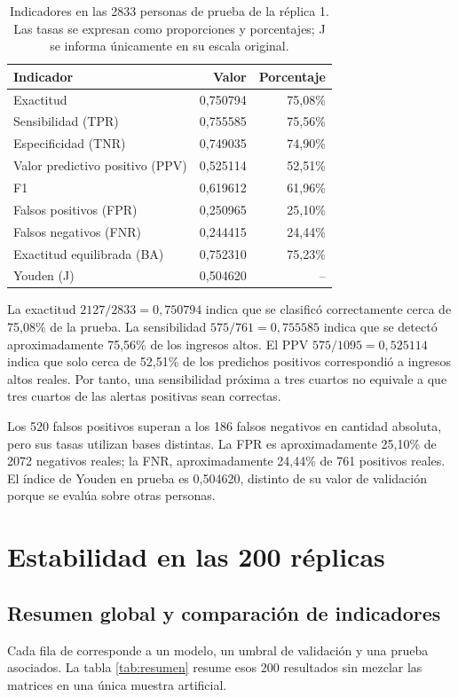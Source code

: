 \documentclass[11pt,a4paper]{article}
\newcommand{\archivo}[1]{\path{#1}}
\begin{document}
\begin{table}[H]
\centering
\caption[Indicadores en las 2833 personas de prueba de la réplica 1.]{Indicadores en las 2833 personas de prueba de la réplica 1. Las tasas se expresan como proporciones y porcentajes; J se informa únicamente en su escala original.}\label{tab:metricas1}
\small
\setlength{\tabcolsep}{4pt}
\begin{tabular}{lrr}
\toprule
Indicador & Valor & Porcentaje \\
\midrule
Exactitud & 0,750794 & 75,08\% \\
Sensibilidad (TPR) & 0,755585 & 75,56\% \\
Especificidad (TNR) & 0,749035 & 74,90\% \\
Valor predictivo positivo (PPV) & 0,525114 & 52,51\% \\
F1 & 0,619612 & 61,96\% \\
Falsos positivos (FPR) & 0,250965 & 25,10\% \\
Falsos negativos (FNR) & 0,244415 & 24,44\% \\
Exactitud equilibrada (BA) & 0,752310 & 75,23\% \\
Youden (J) & 0,504620 & -- \\
\bottomrule
\end{tabular}
\end{table}

La exactitud $2127/2833=0,750794$ indica que se clasificó correctamente cerca de 75,08\% de la prueba. La sensibilidad $575/761=0,755585$ indica que se detectó aproximadamente 75,56\% de los ingresos altos. El PPV $575/1095=0,525114$ indica que solo cerca de 52,51\% de los predichos positivos correspondió a ingresos altos reales. Por tanto, una sensibilidad próxima a tres cuartos no equivale a que tres cuartos de las alertas positivas sean correctas.

Los 520 falsos positivos superan a los 186 falsos negativos en cantidad absoluta, pero sus tasas utilizan bases distintas. La FPR es aproximadamente 25,10\% de 2072 negativos reales; la FNR, aproximadamente 24,44\% de 761 positivos reales. El índice de Youden en prueba es 0,504620, distinto de su valor de validación porque se evalúa sobre otras personas.

\section{Estabilidad en las 200 réplicas}
\subsection{Resumen global y comparación de indicadores}
Cada fila de \archivo{replicas_indicadores.csv} corresponde a un modelo, un umbral de validación y una prueba asociados. La tabla \ref{tab:resumen} resume esos 200 resultados sin mezclar las matrices en una única muestra artificial.
\end{document}
